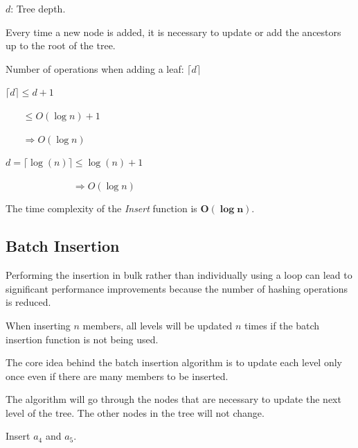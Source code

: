 \documentclass{article}
\begin{document}
$d$: Tree depth.



Every time a new node is added, it is necessary to update or add the ancestors up to the root of the tree.


\label{InsertProof}
Number of operations when adding a leaf: $\lceil d \rceil$



$\lceil d \rceil \leq d + 1$



$\phantom{\lceil m \rceil} \leq O(\log n) + 1$



$\phantom{\lceil m \rceil} \Rightarrow \boxed{O(\log n)}$



$d = \lceil \log (n) \rceil \leq \log (n) + 1$



$\phantom{d = \lceil \log (n) \rceil} \Rightarrow O(\log n)$



The time complexity of the \textit{Insert} function is $\boldsymbol{O(\log n)}$.

\subsection{Batch Insertion}

Performing the insertion in bulk rather than individually using a loop can lead to significant performance improvements because the number of hashing operations is reduced.



When inserting $n$ members, all levels will be updated $n$ times if the batch insertion function is not being used.

The core idea behind the batch insertion algorithm is to update each level only once even if there are many members to be inserted.

The algorithm will go through the nodes that are necessary to update the next level of the tree. The other nodes in the tree will not change.



Insert $a_4$ and $a_5$.
\end{document}
